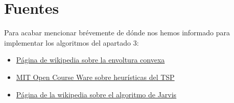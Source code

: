\documentclass{article}
\begin{document}
\section{Fuentes}
Para acabar mencionar brévemente de dónde nos hemos informado para implementar los algoritmos del apartado 3:
\begin{itemize}
 \item \href{https://en.wikipedia.org/wiki/Convex_hull}{Página de wikipedia sobre la envoltura convexa}
 \item \href{https://ocw.mit.edu/courses/civil-and-environmental-engineering/1-203j-logistical-and-transportation-planning-methods-fall-2006/lecture-notes/lec16.pdf}{MIT Open Course Ware sobre heurísticas del TSP}
 \item \href{https://en.wikipedia.org/wiki/Gift_wrapping_algorithm}{Página de la wikipedia sobre el algoritmo de Jarvis}
\end{itemize}
\end{document}
